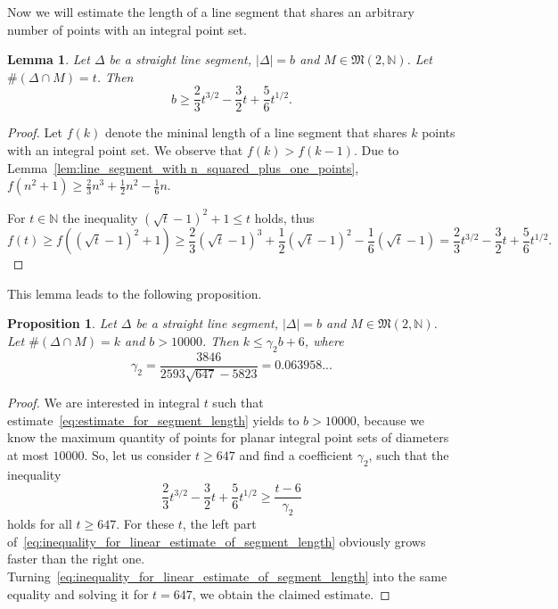 \documentclass[a4paper,14pt]{article} %
\theoremstyle{plain}
\newtheorem{lemma}[theorem]{Lemma}
\newtheorem{proposition}[theorem]{Proposition}
\theoremstyle{definition}
\begin{document}
Now we will estimate the length of a line segment that shares an arbitrary number of points
with an integral point set.

\begin{lemma}
	Let $\Delta$ be a straight line segment, $|\Delta| = b$ and $M \in \mathfrak{M}(2,\mathbb{N})$.
	Let $\#(\Delta \cap M) = t$.
	Then
	\begin{equation}
		\label{eq:estimate_for_segment_length}
		b\geq \frac{2}{3}t^{3/2}-\frac{3}{2}t+\frac{5}{6}t^{1/2}
		.
	\end{equation}
\end{lemma}

\begin{proof}
	Let $f(k)$ denote the mininal length of a line segment
	that shares $k$ points with an integral point set.
	We observe that $f(k) > f (k-1)$.
	Due to Lemma~\ref{lem:line_segment_with n_squared_plus_one_points},
	$f(n^2+1) \geq \frac{2}{3}n^3+\frac{1}{2}n^2-\frac{1}{6}n$.

	For $t\in\mathbb{N}$ the inequality $(\sqrt{t} - 1)^2 +1 \leq t$ holds,
	thus
	\begin{equation}
		\label{eq:line_segment_length}
		f(t) \geq f((\sqrt{t} - 1)^2 +1) \geq \frac{2}{3}(\sqrt{t} - 1)^3+\frac{1}{2}(\sqrt{t} - 1)^2-\frac{1}{6}(\sqrt{t} - 1)
		=
		\frac{2}{3}t^{3/2}-\frac{3}{2}t+\frac{5 }{6}t^{1/2}
		.
	\end{equation}
\end{proof}

This lemma leads to the following proposition.

\begin{proposition}
	\label{obs:estimate_points_on_straight_line}
	Let $\Delta$ be a straight line segment, $|\Delta| = b$ and $M \in \mathfrak{M}(2,\mathbb{N})$.
	Let $\#(\Delta \cap M) = k$ and $b>10000$.
	Then $k \leq \gamma_2 b + 6$,
	where
	\begin{equation}
		\gamma_2 = \frac{3846}{2593 \sqrt{647}-5823} = 0.063958...
	\end{equation}
\end{proposition}

\begin{proof}
	We are interested in integral $t$ such that estimate~\eqref{eq:estimate_for_segment_length}
	yields to $b > 10000$, because we know the maximum quantity of points for planar integral point sets of diameters at most $10000$.
	So, let us consider $t\geq 647$ and find a coefficient $\gamma_2$,
	such that the inequality
	\begin{equation}
		\label{eq:inequality_for_linear_estimate_of_segment_length}
		\frac{2}{3}t^{3/2}-\frac{3}{2}t+\frac{5 }{6}t^{1/2} \geq \frac{t-6}{\gamma_2}
	\end{equation}
	holds for all $t\geq 647$.
	For these $t$,
	the left part of~\eqref{eq:inequality_for_linear_estimate_of_segment_length} obviously grows faster than the right one.
	Turning~\eqref{eq:inequality_for_linear_estimate_of_segment_length} into the same equality
	and solving it for $t=647$, we obtain the claimed estimate.
\end{proof}
\end{document}
